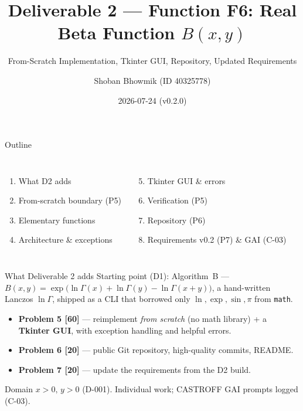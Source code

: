 \documentclass[aspectratio=169]{beamer}
\title[SOEN 6011 --- D2 --- $B(x,y)$]{Deliverable 2 --- Function F6: Real Beta Function $B(x,y)$}
\subtitle{From-Scratch Implementation, Tkinter GUI, Repository, Updated Requirements}
\author[S. Bhowmik]{Shoban Bhowmik \quad (ID 40325778)}
\institute[Concordia]{SOEN 6011 --- Software Engineering Processes --- Section CC}
\date{2026-07-24 \quad (v0.2.0)}
\begin{document}
\begin{frame}\titlepage\end{frame}

\begin{frame}{Outline}
  \begin{columns}[t]
    \begin{enumerate}
      \item What D2 adds
      \item From-scratch boundary (P5)
      \item Elementary functions
      \item Architecture \& exceptions
    \end{enumerate}
    \begin{enumerate}\setcounter{enumi}{4}
      \item Tkinter GUI \& errors
      \item Verification (P5)
      \item Repository (P6)
      \item Requirements v0.2 (P7) \& GAI (C-03)
    \end{enumerate}
  \end{columns}
\end{frame}

\begin{frame}{What Deliverable 2 adds}
Starting point (D1): Algorithm~B --- $B(x,y)=\exp\!\big(\ln\Gamma(x)+\ln\Gamma(y)-\ln\Gamma(x{+}y)\big)$,
a hand-written Lanczos $\ln\Gamma$, shipped as a CLI that borrowed only
$\ln,\exp,\sin,\pi$ from \texttt{math}.
\begin{itemize}
  \item \textbf{Problem 5 [60]} --- reimplement \emph{from scratch} (no math library) + a \textbf{Tkinter GUI}, with exception handling and helpful errors.
  \item \textbf{Problem 6 [20]} --- public Git repository, high-quality commits, README.
  \item \textbf{Problem 7 [20]} --- update the requirements from the D2 build.
\end{itemize}
\vfill
\footnotesize Domain $x>0,\,y>0$ (D-001). Individual work; CASTROFF GAI prompts logged (C-03).
\end{frame}
\end{document}
